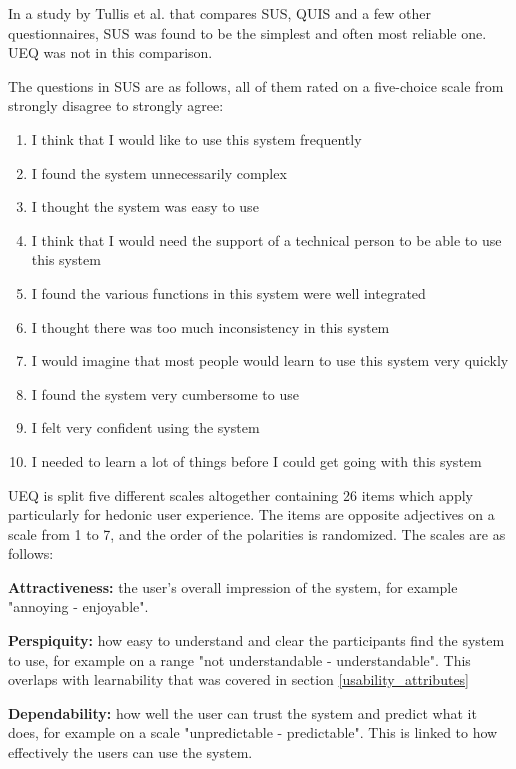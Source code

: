 In a study by Tullis et al. \cite{tullis2004comparison} that compares SUS, QUIS and a few other questionnaires, SUS was found to be the simplest and often most reliable one. UEQ was not in this comparison.

The questions in SUS are as follows, all of them rated on a five-choice scale from strongly disagree to strongly agree:

\begin{enumerate}
\item I think that I would like to use this system frequently
\item I found the system unnecessarily complex
\item I thought the system was easy to use                      
\item I think that I would need the support of a technical person to be able to use this system
\item I found the various functions in this system were well integrated
\item I thought there was too much inconsistency in this system
\item I would imagine that most people would learn to use this system very quickly
\item I found the system very cumbersome to use
\item I felt very confident using the system
\item I needed to learn a lot of things before I could get going with this system 
\end{enumerate}

UEQ is split five different scales altogether containing 26 items which apply particularly for hedonic user experience. The items are opposite adjectives on a scale from 1 to 7, and the order of the polarities is randomized. The scales are as follows:

\textbf{Attractiveness:} the user's overall impression of the system, for example "annoying - enjoyable".

\textbf{Perspiquity:} how easy to understand and clear the participants find the system to use, for example on a range "not understandable - understandable". This overlaps with learnability that was covered in section \ref{usability_attributes}

\textbf{Dependability:} how well the user can trust the system and predict what it does, for example on a scale "unpredictable - predictable". This is linked to how effectively the users can use the system.

